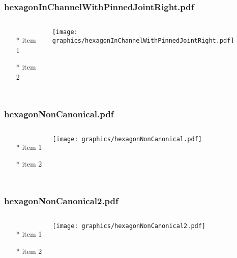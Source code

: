 \documentclass{beamer}
\begin{document}
\begin{frame} \frametitle{hexagonInChannelWithPinnedJointRight.pdf}
    \begin{columns}[c]
        \begin{itemize}
            \item[*] item 1
            \item[*] item 2
        \end{itemize}
        \begin{minipage}{\linewidth}
            \begin{center}
            \texttt{[image: graphics/hexagonInChannelWithPinnedJointRight.pdf]}
            \label{gfx:hexagonInChannelWithPinnedJointRight.pdf}
            \end{center}
        \end{minipage}
    \end{columns}
\end{frame}
\begin{frame} \frametitle{hexagonNonCanonical.pdf}
    \begin{columns}[c]
        \begin{itemize}
            \item[*] item 1
            \item[*] item 2
        \end{itemize}
        \begin{minipage}{\linewidth}
            \begin{center}
            \texttt{[image: graphics/hexagonNonCanonical.pdf]}
            \label{gfx:hexagonNonCanonical.pdf}
            \end{center}
        \end{minipage}
    \end{columns}
\end{frame}
\begin{frame} \frametitle{hexagonNonCanonical2.pdf}
    \begin{columns}[c]
        \begin{itemize}
            \item[*] item 1
            \item[*] item 2
        \end{itemize}
        \begin{minipage}{\linewidth}
            \begin{center}
            \texttt{[image: graphics/hexagonNonCanonical2.pdf]}
            \label{gfx:hexagonNonCanonical2.pdf}
            \end{center}
        \end{minipage}
    \end{columns}
\end{frame}
\end{document}
